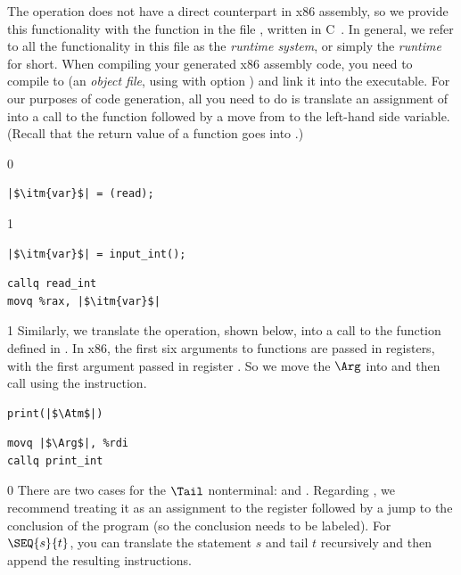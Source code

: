 \documentclass[7x10]{TimesAPriori_MIT}%
\def\racketEd{0}
\def\pythonEd{1}
\def\edition{1}
\newcommand{\pythonColor}[0]{}
\numberwithin{theorem}{chapter}
\numberwithin{definition}{chapter}
\numberwithin{equation}{chapter}
\begin{document}
The \READOP{} operation does not have a direct counterpart in x86
assembly, so we provide this functionality with the function
 in the file , written in
C~\citep{Kernighan:1988nx}. In general, we refer to all the
functionality in this file as the \emph{runtime system}, or simply the \emph{runtime} for short. When compiling your
generated x86 assembly code, you need to compile  to
 (an \emph{object file}, using  with option
) and link it into the executable. For our purposes of code
generation, all you need to do is translate an assignment of
\READOP{} into a call to the  function followed by a
move from  to the left-hand side variable.  (Recall that the
return value of a function goes into .)  
\begin{transformation}
{\if\edition\racketEd  
\begin{lstlisting}
|$\itm{var}$| = (read);
\end{lstlisting}
\fi}
{\if\edition\pythonEd\pythonColor
\begin{lstlisting}
|$\itm{var}$| = input_int();
\end{lstlisting}
\fi}
\compilesto
\begin{lstlisting}
callq read_int
movq %rax, |$\itm{var}$|
\end{lstlisting}
\end{transformation}

{\if\edition\pythonEd\pythonColor
%
Similarly, we translate the  operation, shown below, into
a call to the  function defined in .
In x86, the first six arguments to functions are passed in registers,
with the first argument passed in register . So we move the
$\Arg$ into  and then call  using the
 instruction.
\begin{transformation}
\begin{lstlisting}
print(|$\Atm$|)    
\end{lstlisting}
\compilesto
\begin{lstlisting}
movq |$\Arg$|, %rdi
callq print_int  
\end{lstlisting}
\end{transformation}
%
\fi}  

{\if\edition\racketEd
There are two cases for the $\Tail$ nonterminal:  and
. Regarding , we recommend treating it as an
assignment to the  register followed by a jump to the
conclusion of the program (so the conclusion needs to be labeled).
For $\SEQ{s}{t}$, you can translate the statement $s$ and tail $t$
recursively and then append the resulting instructions.
\fi}
\end{document}
